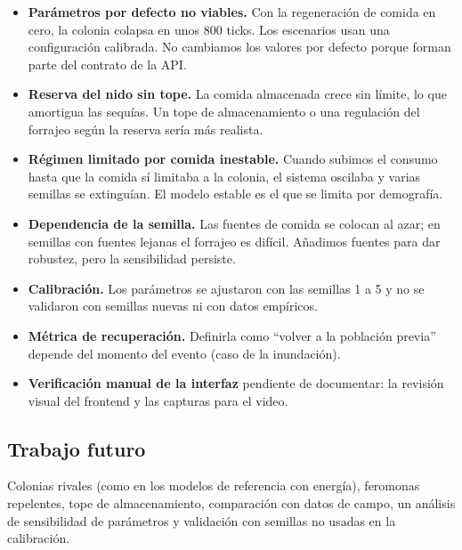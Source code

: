 \documentclass[11pt,a4paper]{article}
\begin{document}
\begin{itemize}
  \item \textbf{Parámetros por defecto no viables.} Con la regeneración de comida en cero, la colonia colapsa en unos 800 ticks. Los escenarios usan una configuración calibrada. No cambiamos los valores por defecto porque forman parte del contrato de la API.
  \item \textbf{Reserva del nido sin tope.} La comida almacenada crece sin límite, lo que amortigua las sequías. Un tope de almacenamiento o una regulación del forrajeo según la reserva sería más realista.
  \item \textbf{Régimen limitado por comida inestable.} Cuando subimos el consumo hasta que la comida sí limitaba a la colonia, el sistema oscilaba y varias semillas se extinguían. El modelo estable es el que se limita por demografía.
  \item \textbf{Dependencia de la semilla.} Las fuentes de comida se colocan al azar; en semillas con fuentes lejanas el forrajeo es difícil. Añadimos fuentes para dar robustez, pero la sensibilidad persiste.
  \item \textbf{Calibración.} Los parámetros se ajustaron con las semillas 1 a 5 y no se validaron con semillas nuevas ni con datos empíricos.
  \item \textbf{Métrica de recuperación.} Definirla como ``volver a la población previa'' depende del momento del evento (caso de la inundación).
  \item \textbf{Verificación manual de la interfaz} pendiente de documentar: la revisión visual del frontend y las capturas para el video.
\end{itemize}

\subsection{Trabajo futuro}

Colonias rivales (como en los modelos de referencia con energía), feromonas repelentes, tope de almacenamiento, comparación con datos de campo, un análisis de sensibilidad de parámetros y validación con semillas no usadas en la calibración.


\nocite{*}

\end{document}
